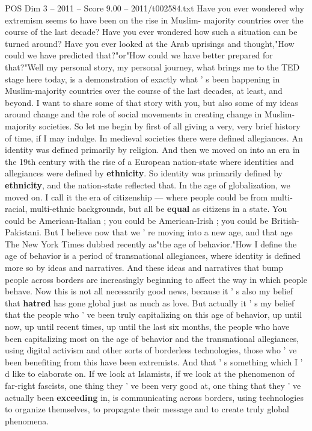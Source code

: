 \begin{textsample}{POS Dim 3 – 2011 – Score 9.00 – 2011/t002584.txt}  \label{ex:f3_pos_059}
Have you ever wondered why extremism seems to have been on the rise in Muslim- majority countries over the course of the last decade?
Have you ever wondered how such a situation can be turned around?
Have you ever looked at the Arab uprisings and thought,"How could we have predicted that?"or"How could we have better prepared for that?"Well my personal story, my personal journey, what brings me to the TED stage here today, is a demonstration of exactly what ' s been happening in Muslim-majority countries over the course of the last decades, at least, and beyond.
I want to share some of that story with you, but also some of my ideas around change and the role of social movements in creating change in Muslim-majority societies.
So let me begin by first of all giving a very, very brief history of time, if I may indulge.
In medieval societies there were defined allegiances.
An identity was defined primarily by religion.
And then we moved on into an era in the 19th century with the rise of a European nation-state where identities and allegiances were defined by \textbf{ethnicity}.
So identity was primarily defined by \textbf{ethnicity}, and the nation-state reflected that.
In the age of globalization, we moved on.
I call it the era of citizenship — where people could be from multi-racial, multi-ethnic backgrounds, but all be \textbf{equal} as citizens in a state.
You could be American-Italian ; you could be American-Irish ; you could be British-Pakistani.
But I believe now that we ' re moving into a new age, and that age The New York Times dubbed recently as"the age of behavior."How I define the age of behavior is a period of transnational allegiances, where identity is defined more so by ideas and narratives.
And these ideas and narratives that bump people across borders are increasingly beginning to affect the way in which people behave.
Now this is not all necessarily good news, because it ' s also my belief that \textbf{hatred} has gone global just as much as love.
But actually it ' s my belief that the people who ' ve been truly capitalizing on this age of behavior, up until now, up until recent times, up until the last six months, the people who have been capitalizing most on the age of behavior and the transnational allegiances, using digital activism and other sorts of borderless technologies, those who ' ve been benefiting from this have been extremists.
And that ' s something which I ' d like to elaborate on.
If we look at Islamists, if we look at the phenomenon of far-right fascists, one thing they ' ve been very good at, one thing that they ' ve actually been \textbf{exceeding} in, is communicating across borders, using technologies to organize themselves, to propagate their message and to create truly global phenomena.

\end{textsample}
